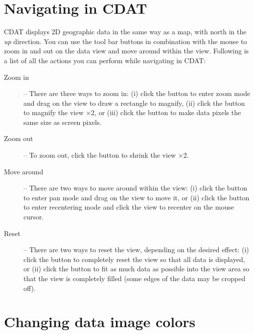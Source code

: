 
\section{Navigating in CDAT}

CDAT displays 2D geographic data in the same way as a map, with
north in the {\em up} direction.  You can use the tool bar
buttons in combination with the mouse to zoom in and out on the
data view and move around within the view.  Following is a list
of all the actions you can perform while navigating in CDAT:
\begin{description}

\item[Zoom in] -- There are three ways to zoom in: (i) click
the  button to enter zoom mode and
drag on the view to draw a rectangle to magnify, (ii) click the
 button to magnify the view $\times$2,
or (iii) click the  button to make data
pixels the same size as screen pixels.

\item[Zoom out] -- To zoom out, click the
 button to shrink the view $\times$2.

\item[Move around] -- There are two ways to move around
within the view: (i) click the  button to
enter pan mode and drag on the view to move it, or (ii) click the
 button to enter recentering mode and
click the view to recenter on the mouse cursor.

\item[Reset] -- There are two ways to reset the view,
depending on the desired effect: (i) click the
 button to completely reset the view so that
all data is displayed, or (ii) click the
 button to fit as much data as possible
into the view area so that the view is completely filled (some
edges of the data may be cropped off).

\end{description}

\section{Changing data image colors}
\label{changing_colors}

